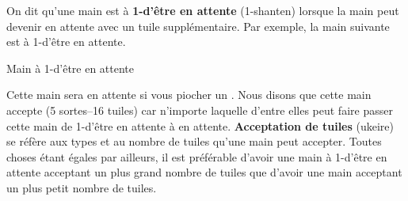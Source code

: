 \bigskip

On dit qu'une main est à {\bf 1-d'être en attente} (1-{\jap shanten}) lorsque la main peut devenir en attente avec un tuile supplémentaire. Par exemple, la main suivante est à 1-d'être en attente.
\bigskip
\begin{itembox}[r]{Main à 1-d'être en attente}
\bp
{}\zhong\zhong\zhong
\ep
\end{itembox}
Cette main sera en attente si vous piocher un {\LARGE{}}. Nous disons que cette main accepte {\LARGE{}} (5 sortes--16 tuiles) car n'importe laquelle d'entre elles peut faire passer cette main de 1-d'être en attente à en attente. {\bf Acceptation de tuiles} ({\jap ukeire}) se réfère aux types et au nombre de tuiles qu'une main peut accepter. Toutes choses étant égales par ailleurs, il est préférable d'avoir une main à 1-d'être en attente acceptant un plus grand nombre de tuiles que d'avoir une main acceptant un plus petit nombre de tuiles. 


